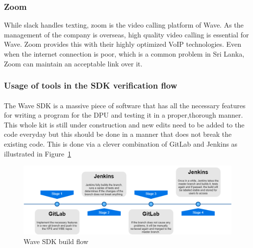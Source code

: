 \subsubsection{Zoom}
While slack handles texting, zoom is the video calling platform of Wave. As the management of the company is overseas, high quality video calling is essential for Wave. Zoom provides this with their highly optimized VoIP technologies. Even when the internet connection is poor, which is a common problem in Sri Lanka, Zoom can maintain an acceptable link over it. 

\subsubsection{Usage of tools in the SDK verification flow}
\paragraph{}
The Wave SDK is a massive piece of software that has all the necessary features for writing a program for the DPU and testing it in a proper,thorough manner. This whole kit is still under construction and new edits need to be added to the code everyday but this should be done in a manner that does not break the existing code. This is done via a clever combination of GitLab and Jenkins as illustrated in Figure~\ref{Fig:build}

\begin{figure}[H]
    \centering  
    \includegraphics[trim=0cm 0cm 0cm 0cm, clip=true,scale=0.4]{figures/build.png}
    \caption{Wave SDK build flow\label{Fig:build}}\vspace{-4mm}
    \end{figure}